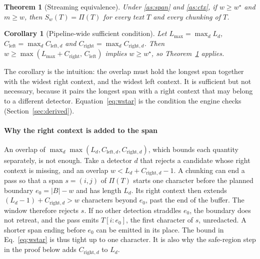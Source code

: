 \documentclass[pdflatex,sn-mathphys-num]{sn-jnl}
\theoremstyle{thmstyleone}
\newtheorem{theorem}{Theorem}
\newtheorem{corollary}{Corollary}
\theoremstyle{thmstylethree}
\begin{document}
\begin{theorem}[Streaming equivalence]\label{thm:stream}
Under \ref{as:span} and \ref{as:ctx}, if $w \ge w^{\star}$ and $m \ge w$, then $S_w(T) = \Pi(T)$ for every text $T$ and every chunking of $T$.
\end{theorem}

\begin{corollary}[Pipeline-wide sufficient condition]\label{cor:coarse}
Let $L_{\max} = \max_d L_d$, $C_{\mathrm{left}} = \max_d C_{\mathrm{left},d}$ and $C_{\mathrm{right}} = \max_d C_{\mathrm{right},d}$. Then $w \ge \max(L_{\max} + C_{\mathrm{right}},\, C_{\mathrm{left}})$ implies $w \ge w^{\star}$, so Theorem~\ref{thm:stream} applies.
\end{corollary}

The corollary is the intuition: the overlap must hold the longest span together with the widest right context, and the widest left context. It is sufficient but not necessary, because it pairs the longest span with a right context that may belong to a different detector. Equation~\eqref{eq:wstar} is the condition the engine checks (Section~\ref{sec:derived}).

\paragraph{Why the right context is added to the span}
An overlap of $\max_d \max(L_d, C_{\mathrm{left},d}, C_{\mathrm{right},d})$, which bounds each quantity separately, is not enough. Take a detector $d$ that rejects a candidate whose right context is missing, and an overlap $w < L_d + C_{\mathrm{right},d} - 1$. A chunking can end a pass so that a span $s = (i, j)$ of $\Pi(T)$ starts one character before the planned boundary $e_0 = |B| - w$ and has length $L_d$. Its right context then extends $(L_d - 1) + C_{\mathrm{right},d} > w$ characters beyond $e_0$, past the end of the buffer. The window therefore rejects $s$. If no other detection straddles $e_0$, the boundary does not retreat, and the pass emits $T[i : e_0]$, the first character of $s$, unredacted. A shorter span ending before $e_0$ can be emitted in its place. The bound in Eq.~\eqref{eq:wstar} is thus tight up to one character. It is also why the safe-region step in the proof below adds $C_{\mathrm{right},d}$ to $L_d$.
\end{document}
